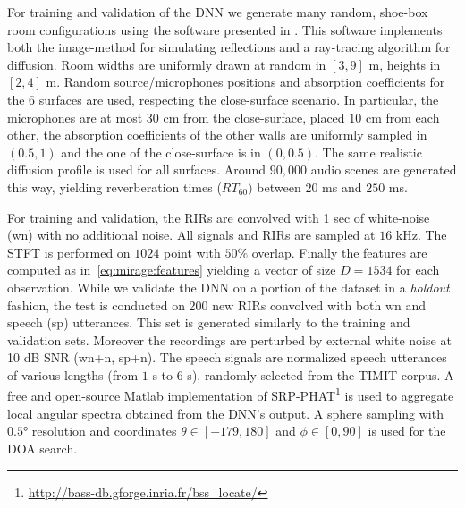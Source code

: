 For training and validation of the DNN we generate many random, shoe-box room configurations using the software presented in .
This software implements both the image-method for simulating reflections and a ray-tracing algorithm for diffusion.
Room widths are uniformly drawn at random in $[3, 9]$ m, heights in $[2, 4]$ m.
Random source/microphones positions and absorption coefficients for the 6 surfaces are used,
respecting the close-surface scenario. In particular, the microphones are at most $30$ cm from the close-surface,
placed $10$ cm from each other, the absorption coefficients of the other walls are
uniformly sampled in $(0.5, 1)$ and the one of the close-surface is in $(0, 0.5)$.
The same realistic diffusion profile  is used for all surfaces.
Around $90,000$ audio scenes are generated this way, yielding reverberation times ($RT_{60})$ between $20$ ms and $250$ ms.

For training and validation, the RIRs are convolved with 1 sec of white-noise (wn) with no additional noise.
All signals and RIRs are sampled at $16$ kHz. The STFT is performed on $1024$ point with $50\%$ overlap.
Finally the features are computed as in~\eqref{eq:mirage:features} yielding a vector of size $D = 1534$ for each observation.
While we validate the DNN on a portion of the dataset in a \textit{holdout} fashion, the test is conducted on 200 new RIRs convolved with both wn and speech (sp) utterances.
This set is generated similarly to the training and validation sets. Moreover the recordings are perturbed by external white noise at 10 dB SNR (wn+n, sp+n).
The speech signals are normalized speech utterances of various lengths (from $1$ s to $6$ s), randomly selected from the TIMIT corpus.
A free and open-source Matlab implementation of SRP-PHAT\footnote{\url{http://bass-db.gforge.inria.fr/bss_locate/}} is used to aggregate local angular spectra obtained from the DNN's output.
A sphere sampling with $\ang{0.5}$ resolution and coordinates $\theta \in [-179, 180]$ and $\phi \in [0, 90]$ is used for the DOA search.

